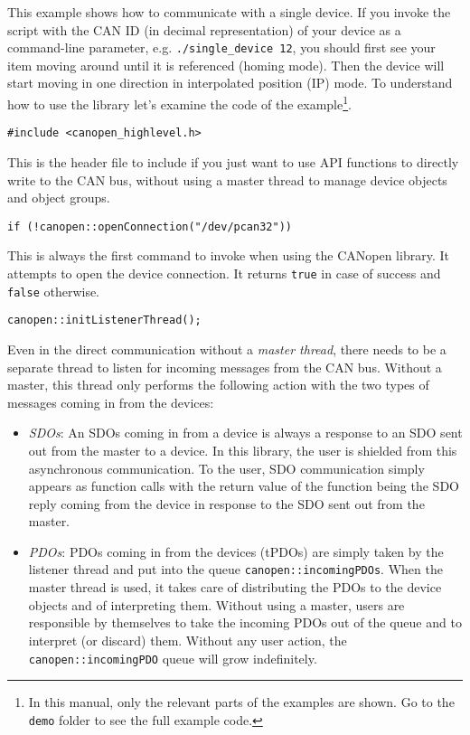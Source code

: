 This example shows how to communicate with a single device. If you invoke the script with the CAN ID (in decimal representation) of your device as a command-line parameter, e.g. \texttt{./single\_device 12}, you should first see your item moving around until it is referenced (homing mode). Then the device will start moving in one direction in interpolated position (IP) mode. To understand how to use the library let's examine the code of the example\footnote{In this manual, only the relevant parts of the examples are shown. Go to the \texttt{demo} folder to see the full example code.}.

\begin{verbatim}
#include <canopen_highlevel.h>
\end{verbatim}
This is the header file to include if you just want to use API functions to directly write to the CAN bus, without using a master thread to manage device objects and object groups.

\begin{verbatim}
if (!canopen::openConnection("/dev/pcan32"))
\end{verbatim}
This is always the first command to invoke when using the CANopen library. It attempts to open the device connection. It returns \texttt{true} in case of success and \texttt{false} otherwise.

\begin{verbatim}
canopen::initListenerThread();
\end{verbatim}
Even in the direct communication without a {\em master thread}, there needs to be a separate thread to listen for incoming messages from the CAN bus. Without a master, this thread only performs the following action with the two types of messages coming in from the devices:
\begin{itemize}
\item {\em SDOs}: An SDOs coming in from a device is always a response to an SDO sent out from the master to a device. In this library, the user is shielded from this asynchronous communication. To the user, SDO communication simply appears as function calls with the return value of the function being the SDO reply coming from the device in response to the SDO sent out from the master. 
\item {\em PDOs}: PDOs coming in from the devices (tPDOs) are simply taken by the listener thread and put into the queue \texttt{canopen::incomingPDOs}. When the master thread is used, it takes care of distributing the PDOs to the device objects and of interpreting them. Without using a master, users are responsible by themselves to take the incoming PDOs out of the queue and to interpret (or discard) them. Without any user action, the \texttt{canopen::incomingPDO} queue will grow indefinitely.
\end{itemize}

